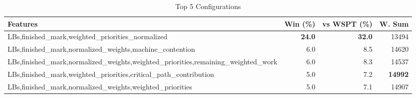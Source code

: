 \begin{table}[htbp]%
\centering%
\begin{tabular}{lrrr}%
\toprule%
\textbf{Features}&\textbf{Win (\%)}&\textbf{vs WSPT (\%)}&\textbf{W. Sum}\\%
\midrule%
LBs,finished_mark,weighted_priorities_normalized&\textbf{24.0}&\textbf{32.0}&13494\\%
LBs,finished_mark,normalized_weights,machine_contention&6.0&8.5&14620\\%
LBs,finished_mark,normalized_weights,weighted_priorities,remaining_weighted_work&6.0&8.3&14537\\%
LBs,finished_mark,weighted_priorities,critical_path_contribution&5.0&7.2&\textbf{14992}\\%
LBs,finished_mark,normalized_weights,weighted_priorities&5.0&7.1&14907\\%
\bottomrule%
\end{tabular}%
\caption{Top 5 Configurations}%
\label{tab:summary}%
\end{table}